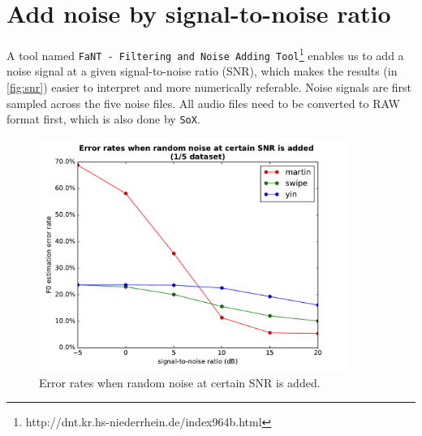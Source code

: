 \documentclass[11pt,a4paper]{report}
\begin{document}
\newpage

\section{Add noise by signal-to-noise ratio}

A tool named \texttt{FaNT - Filtering and Noise Adding Tool}\footnote{http://dnt.kr.hs-niederrhein.de/index964b.html} enables us to add a noise signal at a given signal-to-noise ratio (SNR), which makes the results (in \autoref{fig:snr}) easier to interpret and more numerically referable.
Noise signals are first sampled across the five noise files.
All audio files need to be converted to RAW format first, which is also done by \texttt{SoX}.

\begin{figure}[htbp]
  \centering
  \includegraphics[width=0.9\textwidth]{error_rates_vs_snrs.pdf}
  \caption{Error rates when random noise at certain SNR is added.} \label{fig:snr}
\end{figure}
\end{document}
